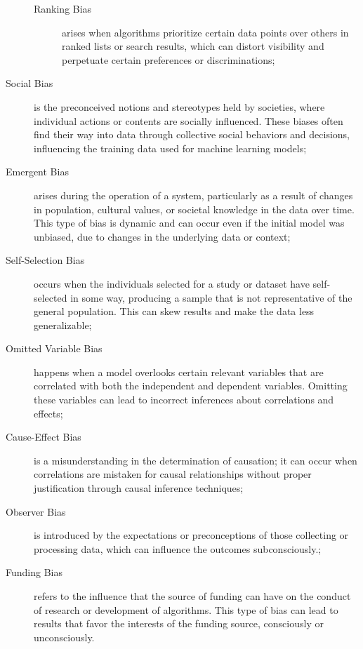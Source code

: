 \begin{description}
\begin{description}
        \item[Ranking Bias] arises when algorithms prioritize certain data points over others in ranked lists or search results, which can distort visibility and perpetuate certain preferences or discriminations;
    \end{description}
    
    \item[Social Bias] is the preconceived notions and stereotypes held by societies, where individual actions or contents are socially influenced. These biases often find their way into data through collective social behaviors and decisions, influencing the training data used for machine learning models;

    \item[Emergent Bias] arises during the operation of a system, particularly as a result of changes in population, cultural values, or societal knowledge in the data over time. This type of bias is dynamic and can occur even if the initial model was unbiased, due to changes in the underlying data or context;

    \item[Self-Selection Bias] occurs when the individuals selected for a study or dataset have self-selected in some way, producing a sample that is not representative of the general population. This can skew results and make the data less generalizable;

    \item[Omitted Variable Bias] happens when a model overlooks certain relevant variables that are correlated with both the independent and dependent variables. Omitting these variables can lead to incorrect inferences about correlations and effects;

    \item[Cause-Effect Bias] is a misunderstanding in the determination of causation; it can occur when correlations are mistaken for causal relationships without proper justification through causal inference techniques;

    \item[Observer Bias] is introduced by the expectations or preconceptions of those collecting or processing data, which can influence the outcomes subconsciously.;
    
    \item[Funding Bias] refers to the influence that the source of funding can have on the conduct of research or development of algorithms. This type of bias can lead to results that favor the interests of the funding source, consciously or unconsciously.
\end{description}

